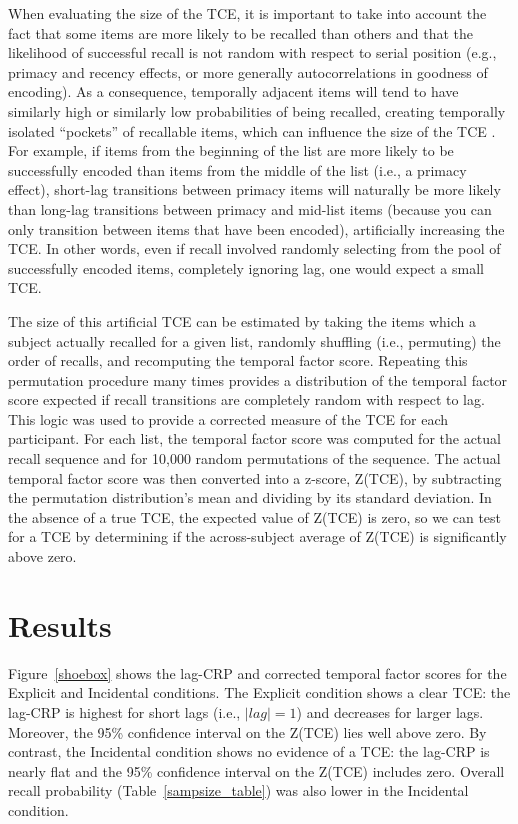 \documentclass[man,natbib,floatsintext]{apa6} %
\begin{document}
When evaluating the size of the TCE, it is important to take into account the fact that some items are more likely to be recalled than others and that the likelihood of successful recall is not random with respect to serial position (e.g., primacy and recency effects, or more generally autocorrelations in goodness of encoding). As a consequence, temporally adjacent items will tend to have similarly high or similarly low probabilities of being recalled, creating temporally isolated ``pockets'' of recallable items, which can influence the size of the TCE \citep{Hint16,SedeEtal10}. For example, if items from the beginning of the list are more likely to be successfully encoded than items from the middle of the list (i.e., a primacy effect), short-lag transitions between primacy items will naturally be more likely than long-lag transitions between primacy and mid-list items (because you can only transition between items that have been encoded), artificially increasing the TCE. In other words, even if recall involved randomly selecting from the pool of successfully encoded items, completely ignoring lag, one would expect a small TCE.

The size of this artificial TCE can be estimated by taking the items which a subject actually recalled for a given list, randomly shuffling (i.e., permuting) the order of recalls, and recomputing the temporal factor score. Repeating this permutation procedure many times provides a distribution of the temporal factor score expected if recall transitions are completely random with respect to lag. This logic was used to provide a corrected measure of the TCE for each participant. For each list, the temporal factor score was computed for the actual recall sequence and for 10,000 random permutations of the sequence.
The actual temporal factor score was then converted into a z-score, Z(TCE), by subtracting the permutation distribution's mean and dividing by its standard deviation. In the absence of a true TCE, the expected value of Z(TCE) is zero, so we can test for a TCE by determining if the across-subject average of Z(TCE) is significantly above zero.

\section{Results}



Figure~\ref{shoebox} shows the lag-CRP and corrected temporal factor scores for the Explicit and Incidental conditions. The Explicit condition shows a clear TCE: the lag-CRP is highest for short lags (i.e., $|lag|=1$) and decreases for larger lags. Moreover, the 95\% confidence interval on the Z(TCE) lies well above zero. By contrast, the Incidental condition shows no evidence of a TCE: the lag-CRP is nearly flat and the 95\% confidence interval on the Z(TCE) includes zero. Overall recall probability (Table~\ref{sampsize_table}) was also lower in the Incidental condition.
\end{document}
